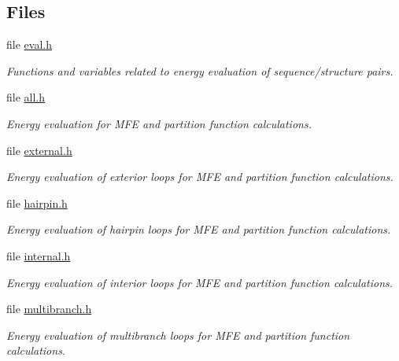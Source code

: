 \subsection*{Files}
\begin{DoxyCompactItemize}
\item 
file \hyperlink{eval_8h}{eval.\+h}
\begin{DoxyCompactList}\small\item\em Functions and variables related to energy evaluation of sequence/structure pairs. \end{DoxyCompactList}\item 
file \hyperlink{all_8h}{all.\+h}
\begin{DoxyCompactList}\small\item\em Energy evaluation for M\+FE and partition function calculations. \end{DoxyCompactList}\item 
file \hyperlink{external_8h}{external.\+h}
\begin{DoxyCompactList}\small\item\em Energy evaluation of exterior loops for M\+FE and partition function calculations. \end{DoxyCompactList}\item 
file \hyperlink{hairpin_8h}{hairpin.\+h}
\begin{DoxyCompactList}\small\item\em Energy evaluation of hairpin loops for M\+FE and partition function calculations. \end{DoxyCompactList}\item 
file \hyperlink{internal_8h}{internal.\+h}
\begin{DoxyCompactList}\small\item\em Energy evaluation of interior loops for M\+FE and partition function calculations. \end{DoxyCompactList}\item 
file \hyperlink{multibranch_8h}{multibranch.\+h}
\begin{DoxyCompactList}\small\item\em Energy evaluation of multibranch loops for M\+FE and partition function calculations. \end{DoxyCompactList}\end{DoxyCompactItemize}
